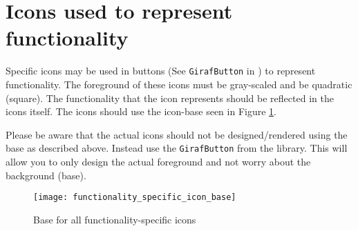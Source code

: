 \section{Icons used to represent functionality}
Specific icons may be used in buttons (See \texttt{GirafButton} in \gc) to represent functionality. The foreground of these icons must be gray-scaled and be quadratic (square). The functionality that the icon represents should be reflected in the icons itself. The icons should use the icon-base seen in Figure \ref{fig:functionality_specific_icon_base}.

\begin{note}
	Please be aware that the actual icons should not be designed/rendered using the base as described above. Instead use the \texttt{GirafButton} from the \gc library. This will allow you to only design the actual foreground and not worry about the background (base).
\end{note}

\begin{figure}[h]
	\centering
	\texttt{[image: functionality\_specific\_icon\_base]}
	\caption{Base for all functionality-specific icons}
	\label{fig:functionality_specific_icon_base}
\end{figure}

